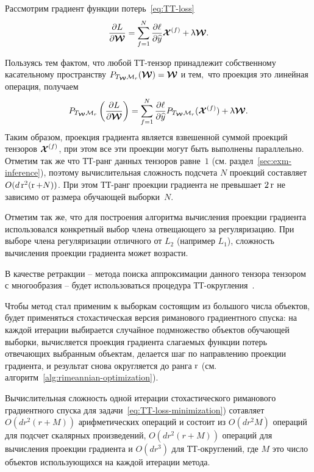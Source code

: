 Рассмотрим градиент функции потерь~\eqref{eq:TT-loss}
\begin{equation}
\label{eq:TT-gradient}
\frac{\partial L}{\partial \boldsymbol{\mathcal{W}}} = \sum_{f=1}^N \frac{\partial \ell}{\partial \widehat{y}} \boldsymbol{\mathcal{X}}^{(f)} + \uplambda \boldsymbol{\mathcal{W}}.
\end{equation}

Пользуясь тем фактом, что любой ТТ-тензор принадлежит собственному касательному пространству $P_{T_{\boldsymbol{\mathcal{W}}} \mathcal{M}_r}(\boldsymbol{\mathcal{W}}) = \boldsymbol{\mathcal{W}}$ и тем, что проекция это линейная операция, получаем
\begin{equation}
\label{eq:riemannian-gradient}
P_{T_{\boldsymbol{\mathcal{W}}} \mathcal{M}_r}\left ( \frac{\partial L}{\partial \boldsymbol{\mathcal{W}}} \right) = \sum_{f=1}^N \frac{\partial \ell}{\partial \widehat{y}} P_{T_{\boldsymbol{\mathcal{W}}} \mathcal{M}_r}(\boldsymbol{\mathcal{X}}^{(f)}) + \uplambda \boldsymbol{\mathcal{W}}.
\end{equation}
Таким образом, проекция градиента является взвешенной суммой проекций тензоров $\boldsymbol{\mathcal{X}}^{(f)}$, при этом все эти проекции могут быть выполнены параллельно.
Отметим так же что ТТ-ранг данных тензоров равне~$1$ (см. раздел~\ref{sec:exm-inference}), поэтому вычислительная сложность подсчета $N$ проекций составляет $O(d \operatorname{r}^2 (\operatorname{r} + N))$.
При этом ТТ-ранг проекции градиента  не превышает $2 \operatorname{r}$ не зависимо от размера обучающей выборки~$N$.

Отметим так же, что для построения алгоритма вычисления проекции градиента использовался конкретный выбор члена отвещающего за регуляризацию. При выборе члена регуляризации отличного от  $L_2$ (например $L_1$), сложность вычисления проекции градиента может возрасти.

В качестве ретракции -- метода поиска аппроксимации данного тензора тензором с многообразия -- будет использоваться процедура ТТ-округления~\cite{oseledets2011ttMain}.

Чтобы метод стал применим к выборкам состоящим из большого числа объектов, будет применяться стохастическая версия риманового градиентного спуска: на каждой итерации выбирается случайное подмножество объектов обучающей выборки, вычисляется проекция градиента слагаемых функции потерь отвечающих выбранным объектам, делается шаг по направлению проекции градиента, и результат снова округляется до ранга $\operatorname{r}$ (см. алгоритм~\ref{alg:rimeannian-optimization}).

Вычислительная сложность одной итерации стохастического риманового градиентного спуска для задачи~\eqref{eq:TT-loss-minimization}) сотавляет $O(dr^2(r + M))$ арифметических операций и состоит из $O(dr^2M)$ операций для подсчет скалярных произведений,  $O(dr^2(r + M))$ операций для вычисления проекции градиента и $O(dr^3)$ для ТТ-округлений, где $M$ это число объектов использующихся на каждой итерации метода.


